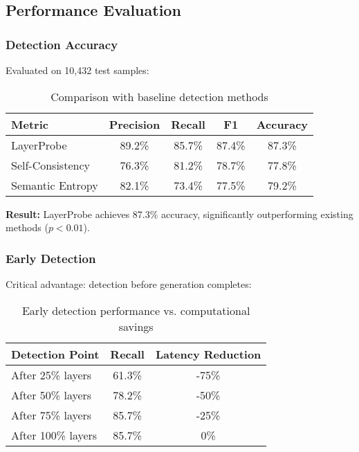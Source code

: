 \documentclass[11pt]{article}
\begin{document}
\subsection{Performance Evaluation}

\subsubsection{Detection Accuracy}

Evaluated on 10,432 test samples:

\begin{table}[H]
\centering
\begin{tabular}{@{}lcccc@{}}
\toprule
\textbf{Metric} & \textbf{Precision} & \textbf{Recall} & \textbf{F1} & \textbf{Accuracy} \\ \midrule
LayerProbe & 89.2\% & 85.7\% & 87.4\% & 87.3\% \\
Self-Consistency & 76.3\% & 81.2\% & 78.7\% & 77.8\% \\
Semantic Entropy & 82.1\% & 73.4\% & 77.5\% & 79.2\% \\ \bottomrule
\end{tabular}
\caption{Comparison with baseline detection methods}
\end{table}

\textbf{Result:} LayerProbe achieves 87.3\% accuracy, significantly outperforming existing methods ($p < 0.01$).

\subsubsection{Early Detection}

Critical advantage: detection before generation completes:

\begin{table}[H]
\centering
\begin{tabular}{@{}lcc@{}}
\toprule
\textbf{Detection Point} & \textbf{Recall} & \textbf{Latency Reduction} \\ \midrule
After 25\% layers & 61.3\% & -75\% \\
After 50\% layers & 78.2\% & -50\% \\
After 75\% layers & 85.7\% & -25\% \\
After 100\% layers & 85.7\% & 0\% \\ \bottomrule
\end{tabular}
\caption{Early detection performance vs. computational savings}
\end{table}
\end{document}

